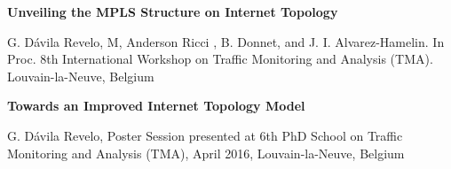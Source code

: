 %
%
%


\begin{scholarship}
					{ \textbf{Unveiling the MPLS Structure on Internet Topology}

					G. Dávila Revelo, M, Anderson Ricci , B. Donnet, and J. I. Alvarez-Hamelin. In Proc. 8th International
                    Workshop on Traffic Monitoring and Analysis (TMA). Louvain-la-Neuve, Belgium}
					{\textbf{Towards an Improved Internet Topology Model}
                    
                    G. Dávila Revelo, Poster Session presented at 6th PhD School on Traffic Monitoring and Analysis (TMA),
                    April 2016, Louvain-la-Neuve, Belgium
                    }

\end{scholarship}
